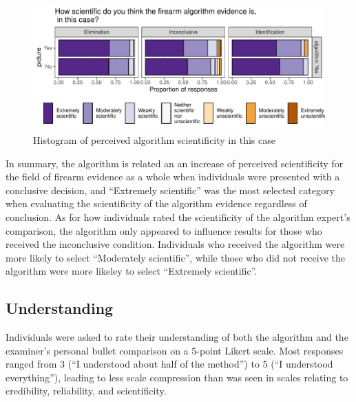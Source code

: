 \documentclass[print]{nuthesis}
\begin{document}
\begin{figure}

{\centering \includegraphics[width=\linewidth]{thesis_files/figure-latex/algsci-1} 

}

\caption{Histogram of perceived algorithm scientificity in this case}\label{fig:algsci}
\end{figure}

In summary, the algorithm is related an an increase of perceived scientificity for the field of firearm evidence as a whole when individuals were presented with a conclusive decision, and ``Extremely scientific'' was the most selected category when evaluating the scientificity of the algorithm evidence regardless of conclusion.
As for how individuals rated the scientificity of the algorithm expert's comparison, the algorithm only appeared to influence results for those who received the inconclusive condition.
Individuals who received the algorithm were more likely to select ``Moderately scientific'', while those who did not receive the algorithm were more likeley to select ``Extremely scientific''.

\hypertarget{understanding}{%
\subsection{Understanding}\label{understanding}}

Individuals were asked to rate their understanding of both the algorithm and the examiner's personal bullet comparison on a 5-point Likert scale. Most responses ranged from 3 (``I understood about half of the method'') to 5 (``I understood everything''), leading to less scale compression than was seen in scales relating to credibility, reliability, and scientificity.
\end{document}
